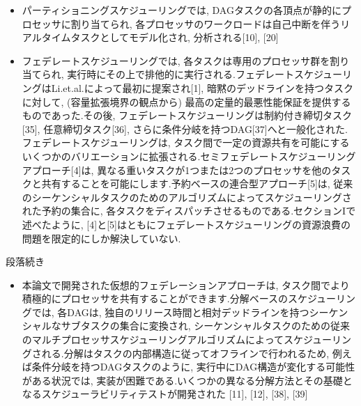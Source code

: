 {    \begin{frame}{}
        \begin{itemize}
            \item パーティショニングスケジューリングでは, DAGタスクの各頂点が静的にプロセッサに割り当てられ, 各プロセッサのワークロードは自己中断を伴うリアルタイムタスクとしてモデル化され, 分析される[10], [20]
            \item フェデレートスケジューリングでは, 各タスクは専用のプロセッサ群を割り当てられ, 実行時にその上で排他的に実行される.フェデレートスケジューリングはLi.et.al.によって最初に提案され[1], 暗黙のデッドラインを持つタスクに対して,  (容量拡張境界の観点から) 最高の定量的最悪性能保証を提供するものであった.その後, フェデレートスケジューリングは制約付き締切タスク[35], 任意締切タスク[36], さらに条件分岐を持つDAG[37]へと一般化された.フェデレートスケジューリングは, タスク間で一定の資源共有を可能にするいくつかのバリエーションに拡張される.セミフェデレートスケジューリングアプローチ[4]は, 異なる重いタスクが1つまたは2つのプロセッサを他のタスクと共有することを可能にします.予約ベースの連合型アプローチ[5]は, 従来のシーケンシャルタスクのためのアルゴリズムによってスケジューリングされた予約の集合に, 各タスクをディスパッチさせるものである.セクションIで述べたように, [4]と[5]はともにフェデレートスケジューリングの資源浪費の問題を限定的にしか解決していない.
        \end{itemize}
    \end{frame}

    \begin{frame}{段落続き}
        \begin{itemize}
            \item 本論文で開発された仮想的フェデレーションアプローチは, タスク間でより積極的にプロセッサを共有することができます.分解ベースのスケジューリングでは, 各DAGは, 独自のリリース時間と相対デッドラインを持つシーケンシャルなサブタスクの集合に変換され, シーケンシャルタスクのための従来のマルチプロセッサスケジューリングアルゴリズムによってスケジューリングされる.分解はタスクの内部構造に従ってオフラインで行われるため, 例えば条件分岐を持つDAGタスクのように, 実行中にDAG構造が変化する可能性がある状況では, 実装が困難である.いくつかの異なる分解方法とその基礎となるスケジューラビリティテストが開発された [11], [12], [38], [39]
        \end{itemize}
    \end{frame}
}
